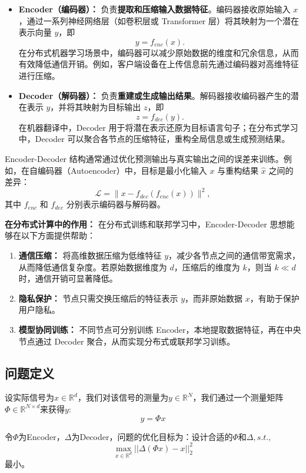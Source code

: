 \documentclass[lang=cn,newtx,10pt,scheme=chinese,chinesefont=nofont,citestyle=gb7714-2015, bibstyle=gb7714-2015]{elegantbook}
\begin{document}
\begin{refsection}
\begin{itemize}
    \item \textbf{Encoder（编码器）：}  
    负责\textbf{提取和压缩输入数据特征}。编码器接收原始输入 $x$，通过一系列神经网络层（如卷积层或 Transformer 层）将其映射为一个潜在表示向量 $y$，即
    \[
    y = f_{enc}(x).
    \]
    在分布式机器学习场景中，编码器可以减少原始数据的维度和冗余信息，从而有效降低通信开销。例如，客户端设备在上传信息前先通过编码器对高维特征进行压缩。

    \item \textbf{Decoder（解码器）：}  
    负责\textbf{重建或生成输出结果}。解码器接收编码器产生的潜在表示 $y$，并将其映射为目标输出 $z$，即
    \[
    z = f_{dec}(y).
    \]
    在机器翻译中，Decoder 用于将潜在表示还原为目标语言句子；在分布式学习中，Decoder 可以聚合各节点的压缩特征，重构全局信息或生成预测结果。
\end{itemize}

Encoder-Decoder 结构通常通过优化预测输出与真实输出之间的误差来训练。例如，在自编码器（Autoencoder）中，目标是最小化输入 $x$ 与重构结果 $\hat{x}$ 之间的差异：
\[
\mathcal{L} = \| x - f_{dec}(f_{enc}(x)) \|^2,
\]
其中 $f_{enc}$ 和 $f_{dec}$ 分别表示编码器与解码器。

\vspace{0.5em}
\noindent\textbf{在分布式计算中的作用：}  
在分布式训练和联邦学习中，Encoder-Decoder 思想能够在以下方面提供帮助：
\begin{enumerate}
    \item \textbf{通信压缩：}  
    将高维数据压缩为低维特征 $y$，减少各节点之间的通信带宽需求，从而降低通信复杂度。若原始数据维度为 $d$，压缩后的维度为 $k$，则当 $k \ll d$ 时，通信开销可显著降低。
    \item \textbf{隐私保护：}  
    节点只需交换压缩后的特征表示 $y$，而非原始数据 $x$，有助于保护用户隐私。
    \item \textbf{模型协同训练：}  
    不同节点可分别训练 Encoder，本地提取数据特征，再在中央节点通过 Decoder 聚合，从而实现分布式或联邦学习训练。
\end{enumerate}

\subsection{问题定义}
设实际信号为$x\in \mathbb{R}^d$，我们对该信号的测量为$y\in \mathbb{R}^N$，我们通过一个测量矩阵$\Phi \in \mathbb{R}^{N\times d}$来获得$y$:$$y=\Phi x$$

令$\Phi$为Encoder，$\Delta$为Decoder，问题的优化目标为：设计合适的$\Phi$和$\Delta , s.t., $ $$\max_{x\in \mathbb{R}^d}{||\Delta(\Phi x)-x||_2^2}$$最小。




\end{refsection}
\end{document}
